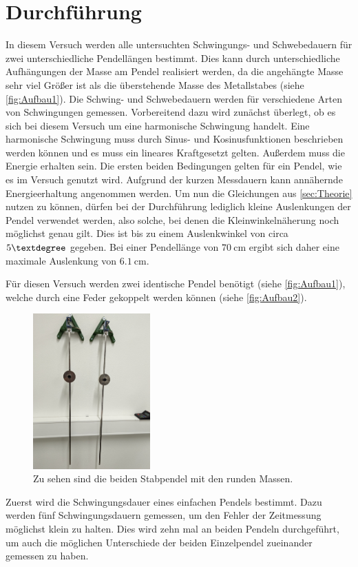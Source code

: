 \section{Durchführung}
\label{sec:Durchführung}
In diesem Versuch werden alle untersuchten Schwingungs- und Schwebedauern für zwei unterschiedliche Pendellängen bestimmt. Dies kann durch unterschiedliche Aufhängungen der Masse am 
Pendel realisiert werden, da die angehängte Masse sehr viel Größer ist als die überstehende Masse des Metallstabes (siehe \autoref{fig:Aufbau1}).
Die Schwing- und Schwebedauern werden für verschiedene Arten von Schwingungen gemessen. Vorbereitend dazu wird zunächst überlegt, ob es sich bei diesem Versuch um eine 
harmonische Schwingung handelt. Eine harmonische Schwingung muss durch  Sinus- und Kosinusfunktionen beschrieben werden können und es muss ein lineares Kraftgesetzt gelten.
Außerdem muss die Energie erhalten sein. Die ersten beiden Bedingungen gelten für ein Pendel, wie es im Versuch genutzt wird. Aufgrund der kurzen Messdauern kann annähernde 
Energieerhaltung angenommen werden. Um nun die Gleichungen aus \autoref{sec:Theorie} nutzen zu können, dürfen bei der Durchführung lediglich kleine Auslenkungen der Pendel 
verwendet werden, also solche, bei denen die Kleinwinkelnäherung noch möglichst genau gilt. Dies ist bis zu einem Auslenkwinkel von circa $5\textdegree$ gegeben. Bei einer 
Pendellänge von $70\:\unit{\centi\metre}$ ergibt sich daher eine maximale Auslenkung von $6.1\:\unit{\centi\metre}$.


Für diesen Versuch werden zwei identische Pendel benötigt (siehe \autoref{fig:Aufbau1}), welche durch eine Feder gekoppelt werden können (siehe \autoref{fig:Aufbau2}).
\begin{figure}
    \centering
    \includegraphics[width=0.4\textwidth]{content/Einzelpendel.jpg}
	\caption{Zu sehen sind die beiden Stabpendel mit den runden Massen.}
	\label{fig:Aufbau1}
\end{figure}
Zuerst wird die Schwingungsdauer eines einfachen Pendels bestimmt. Dazu werden fünf Schwingungsdauern gemessen, um den Fehler der Zeitmessung möglichst klein zu halten.
Dies wird zehn mal an beiden Pendeln durchgeführt, um auch die möglichen Unterschiede der beiden Einzelpendel zueinander gemessen zu haben. 


